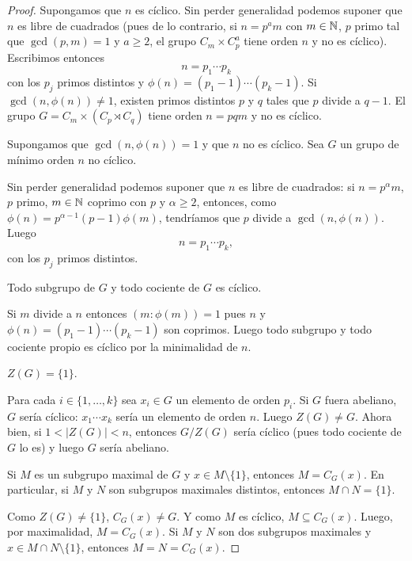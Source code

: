 \begin{proof}
	Supongamos que $n$ es cíclico.  Sin perder generalidad podemos suponer que
	$n$ es libre de cuadrados (pues de lo contrario, si $n=p^am$ con $m\in\mathbb{N}$,
	$p$ primo tal que $\gcd(p,m)=1$ y $a\geq2$, el grupo $C_m\times C_p^a$ tiene
	orden $n$ y no es cíclico).  Escribimos entonces 
	\[
	n=p_1\cdots p_k
	\]
	con los
	$p_j$ primos distintos y $\phi(n)=(p_1-1)\cdots(p_k-1)$. Si
	$\gcd(n,\phi(n))\ne1$, existen primos distintos $p$ y $q$ tales que $p$ divide
	a $q-1$. El grupo $G= C_m\times (C_p\rtimes C_q)$ tiene orden $n=pqm$ y no
	es cíclico.  

	Supongamos que $\gcd(n,\phi(n))=1$ y que $n$ no es cíclico. Sea $G$ un grupo de
	mínimo orden $n$ no cíclico. 

	Sin perder generalidad podemos suponer que $n$ es libre de cuadrados:
	si $n=p^\alpha m$, $p$ primo, $m\in\mathbb{N}$ coprimo con $p$ y $\alpha\geq2$,
	entonces, como $\phi(n)=p^{\alpha-1}(p-1)\phi(m)$, tendríamos que $p$
	divide a $\gcd(n,\phi(n))$. Luego
	\[
		n=p_1\cdots p_k,
	\]
	con los $p_j$ primos distintos.

	\begin{claim}
	  Todo subgrupo de $G$ y todo cociente de $G$ es cíclico.
	\end{claim}

	Si $m$ divide a $n$ entonces $(m:\phi(m))=1$ pues $n$ y
	$\phi(n)=(p_1-1)\cdots(p_k-1)$ son coprimos.  Luego todo subgrupo y
	todo cociente propio es cíclico por la minimalidad de $n$.

	\begin{claim}
	  $Z(G)=\{1\}$.
	\end{claim}

	Para cada $i\in\{1,\dots,k\}$ sea $x_i\in G$ un elemento de orden
	$p_i$. Si $G$ fuera abeliano, $G$ sería cíclico: $x_1\cdots x_k$ sería
	un elemento de orden $n$. Luego $Z(G)\ne G$.  Ahora bien, si
	$1<|Z(G)|<n$, entonces $G/Z(G)$ sería cíclico (pues todo cociente de $G$
	lo es) y luego $G$ sería abeliano. 

	\begin{claim}
	  Si $M$ es un subgrupo maximal de $G$ y $x\in M\setminus\{1\}$, entonces 
	  $M=C_G(x)$. En particular, si $M$ y $N$ son subgrupos
	  maximales distintos, entonces $M\cap N=\{1\}$. 
	\end{claim}

	Como $Z(G)\ne\{1\}$, $C_G(x)\ne G$. Y como $M$ es cíclico,
	$M\subseteq C_G(x)$. Luego, por maximalidad, $M=C_G(x)$. 
	Si $M$ y $N$ son dos subgrupos maximales y $x\in M\cap
	N\setminus\{1\}$, entonces $M=N=C_G(x)$. 


\end{proof}
